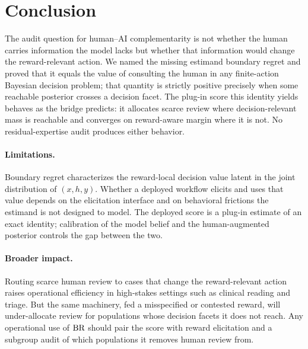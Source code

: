 \section{Conclusion}
\label{sec:conclusion}

The audit question for human--AI complementarity is not whether the human carries information the model lacks but whether that information would change the reward-relevant action.
We named the missing estimand boundary regret and proved that it equals the value of consulting the human in any finite-action Bayesian decision problem; that quantity is strictly positive precisely when some reachable posterior crosses a decision facet.
The plug-in score this identity yields behaves as the bridge predicts: it allocates scarce review where decision-relevant mass is reachable and converges on reward-aware margin where it is not.
No residual-expertise audit produces either behavior.

\paragraph{Limitations.}
Boundary regret characterizes the reward-local decision value latent in the joint distribution of $(x, h, y)$.
Whether a deployed workflow elicits and uses that value depends on the elicitation interface and on behavioral frictions \citep{Vaccaro2024,BucinaEtAl2021} the estimand is not designed to model.
The deployed score is a plug-in estimate of an exact identity; calibration of the model belief and the human-augmented posterior controls the gap between the two.

\paragraph{Broader impact.}
Routing scarce human review to cases that change the reward-relevant action raises operational efficiency in high-stakes settings such as clinical reading and triage.
But the same machinery, fed a misspecified or contested reward, will under-allocate review for populations whose decision facets it does not reach.
Any operational use of $\operatorname{BR}$ should pair the score with reward elicitation and a subgroup audit of which populations it removes human review from.

